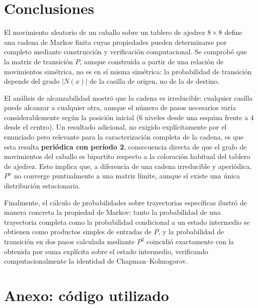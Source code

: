 \documentclass[12pt,a4paper]{article}
\begin{document}

\section{Conclusiones}

El movimiento aleatorio de un caballo sobre un tablero de ajedrez
\(8\times8\) define una cadena de Markov finita cuyas propiedades
pueden determinarse por completo mediante construcción y verificación
computacional. Se comprobó que la matriz de transición \(P\), aunque
construida a partir de una relación de movimientos simétrica, no es
en sí misma simétrica: la probabilidad de transición depende del grado
\(|N(x)|\) de la casilla de origen, no de la de destino.

El análisis de alcanzabilidad mostró que la cadena es irreducible:
cualquier casilla puede alcanzar a cualquier otra, aunque el número de
pasos necesarios varía considerablemente según la posición inicial
(6 niveles desde una esquina frente a 4 desde el centro). Un resultado
adicional, no exigido explícitamente por el enunciado pero relevante
para la caracterización completa de la cadena, es que esta resulta
\textbf{periódica con período 2}, consecuencia directa de que el grafo
de movimientos del caballo es bipartito respecto a la coloración
habitual del tablero de ajedrez. Esto implica que, a diferencia de una
cadena irreducible y aperiódica, \(P^n\) no converge puntualmente a una
matriz límite, aunque sí existe una única distribución estacionaria.

Finalmente, el cálculo de probabilidades sobre trayectorias específicas
ilustró de manera concreta la propiedad de Markov: tanto la
probabilidad de una trayectoria completa como la probabilidad
condicional a un estado intermedio se obtienen como productos simples
de entradas de \(P\), y la probabilidad de transición en dos pasos
calculada mediante \(P^2\) coincidió exactamente con la obtenida por
suma explícita sobre el estado intermedio, verificando computacionalmente
la identidad de Chapman--Kolmogorov.


\section{Anexo: código utilizado}
\end{document}
